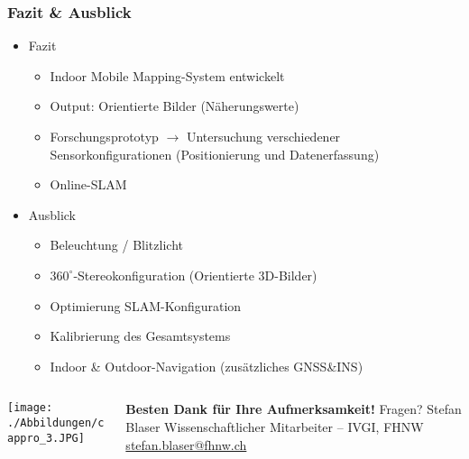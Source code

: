 \documentclass[aspectratio=169]{beamer}
\begin{document}
\begin{frame}
\frametitle{Fazit \& Ausblick}
  \begin{itemize}
   \item Fazit
   \begin{itemize}
    \item Indoor Mobile Mapping-System entwickelt
    \item Output: Orientierte Bilder (Näherungswerte)
    \pause
    \item Forschungsprototyp $\rightarrow$ Untersuchung verschiedener Sensorkonfigurationen (Positionierung und Datenerfassung)
    \pause
    \item Online-SLAM
   \end{itemize}
   \pause
   \item Ausblick
   \begin{itemize}
    \item Beleuchtung / Blitzlicht
    \pause
    \item $360^\circ$-Stereokonfiguration (Orientierte 3D-Bilder)
    \pause
    \item Optimierung SLAM-Konfiguration
    \item Kalibrierung des Gesamtsystems
    \pause
    \item Indoor \& Outdoor-Navigation (zusätzliches GNSS\&INS)
   \end{itemize}
  \end{itemize}
\end{frame}

\begin{frame}
   \begin{columns}[onlytextwidth]
    \begin{column}{0.33\textwidth}
      \texttt{[image: ./Abbildungen/cappro\_3.JPG]}
    \end{column}
    \begin{column}{0.66\textwidth}
      \textbf{Besten Dank für Ihre Aufmerksamkeit!} \newline
      Fragen? \newline
      \newline
      Stefan Blaser\newline
      Wissenschaftlicher Mitarbeiter -- IVGI, FHNW\newline
      \href{mailto:stefan.blaser@fhnw.ch}{stefan.blaser@fhnw.ch}
    \end{column}
  \end{columns}
\end{frame}
\end{document}

